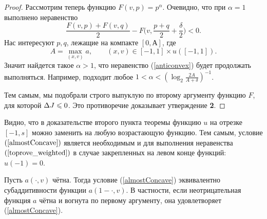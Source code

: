 \begin{proof}
Рассмотрим теперь функцию $F(v, p) = p^\alpha$.
Очевидно, что при $\alpha = 1$ выполнено неравенство
\begin{equation}
\label{anticonvex}
\frac{F(v, p) + F(v, q)}{ 2 } - F \bigl( v, \frac{p + q}{ 2 } + \frac{\delta}{ 2 } \bigr) < 0.
\end{equation}
Нас интересуют $p, q$, лежащие на компакте $[0, А]$, где
\begin{equation*}
A = \max \limits_{(x, v)} a, \qquad (x, v) \in [-1, 1 ] \times u([-1, 1] ).
\end{equation*}
Значит найдется такое $\alpha > 1$, что неравенство (\ref{anticonvex}) будет продолжать выполняться.
Например, подходит любое $1 < \alpha < ( \log_2 \frac{2 A}{A + \delta} )^{-1}$.

Тем самым, мы подобрали строго выпуклую по второму аргументу функцию $F$, для которой $\Delta J \leqslant 0$.
Это противоречие доказывает утверждение \textbf{2}.
\end{proof}

\begin{rem}
\label{landesNecessary}
Видно, что в доказательстве второго пункта теоремы
функцию $u$ на отрезке $[-1, s]$ можно заменить на любую возрастающую функцию.
Тем самым, условие $(\ref{almostConcave})$ является необходимым и для выполнения неравенства $(\ref{toprove_weighted})$
в случае закрепленных на левом конце функций: $u( -1 ) = 0$.
\end{rem}

\begin{rem}
Пусть $a(\cdot, v)$ чётна.
Тогда условие (\ref{almostConcave}) эквивалентно субаддитивности функции $a(1 - \cdot, v)$.
В частности, если неотрицательная функция $a$ чётна и вогнута по первому аргументу, она удовлетворяет (\ref{almostConcave}).
\end{rem}

